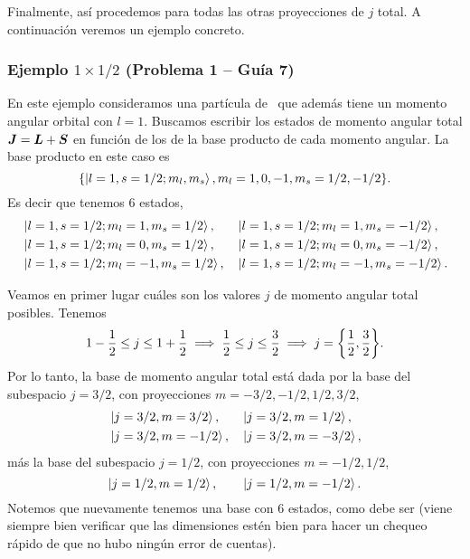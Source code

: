 \documentclass[10pt, a4paper]{article}
\numberwithin{equation}{subsection}
\begin{document}
Finalmente, así procedemos para todas las otras proyecciones de $j$ total. A
continuación veremos un ejemplo concreto.

\subsubsection{Ejemplo $1 \times 1/2$ (Problema 1 -- Guía 7)}

En este ejemplo consideramos una partícula de \spinhalf~que además tiene un
momento angular orbital con $l = 1$. Buscamos escribir los estados de momento
angular total $\vb*{J} = \vb*{L} + \vb*{S}$ en función de los de la base
producto de cada momento angular. La base producto en este caso es
\begin{equation}
  \set{\ket{l=1,s=1/2; m_l, m_s}, m_l = 1, 0, -1, m_s = 1/2, -1/2}.
\end{equation}
Es decir que tenemos 6 estados,
\begin{align}
  &\ket{l=1,s=1/2;m_l=1,m_s=1/2},
  &&\ket{l=1,s=1/2;m_l=1,m_s=-1/2}, \\
  &\ket{l=1,s=1/2;m_l=0,m_s=1/2},
  &&\ket{l=1,s=1/2;m_l=0,m_s=-1/2}, \\
  &\ket{l=1,s=1/2;m_l=-1,m_s=1/2},
  &&\ket{l=1,s=1/2;m_l=-1,m_s=-1/2}.
\end{align}

Veamos en primer lugar cuáles son los valores $j$ de momento angular total
posibles. Tenemos
\begin{equation}
  1 - \frac{1}{2} \leq j \leq 1 + \frac{1}{2} \implies
  \frac{1}{2} \leq j \leq \frac{3}{2} \implies
  j = \set{\frac{1}{2}, \frac{3}{2}}.
\end{equation}
Por lo tanto, la base de momento angular total está dada por la base del
subespacio $j = 3/2$, con proyecciones $m = -3/2, -1/2, 1/2, 3/2$,
\begin{align}
  &\ket{j=3/2,m=3/2},
  &&\ket{j=3/2,m=1/2}, \\
  &\ket{j=3/2,m=-1/2},
  &&\ket{j=3/2,m=-3/2},
\end{align}
más la base del subespacio $j = 1/2$, con proyecciones $m = -1/2, 1/2$,
\begin{equation}
  \ket{j=1/2,m=1/2}, \qquad \ket{j=1/2,m=-1/2}.
\end{equation}
Notemos que nuevamente tenemos una base con 6 estados, como debe ser (viene
siempre bien verificar que las dimensiones estén bien para hacer un chequeo
rápido de que no hubo ningún error de cuentas).
\end{document}
